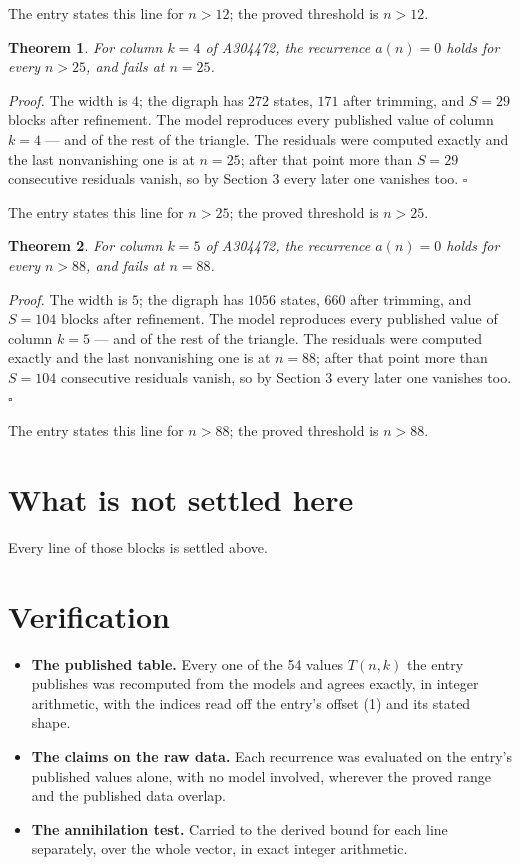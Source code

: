 \documentclass[11pt]{article}
\newtheorem{theorem}{Theorem}
\theoremstyle{definition}
\begin{document}
The entry states this line for $n > 12$; the proved threshold is $n > 12$.

\begin{theorem} For column $k = 4$ of A304472, the recurrence $a(n) = 0$ holds for every $n > 25$, and fails at $n = 25$.\end{theorem}

{\itshape Proof.} The width is $4$; the digraph has $272$ states, $171$ after trimming, and $S = 29$ blocks after refinement. The model reproduces every published value of column $k = 4$ --- and of the rest of the triangle. The residuals were computed exactly and the last nonvanishing one is at $n = 25$; after that point more than $S = 29$ consecutive residuals vanish, so by Section 3 every later one vanishes too. $\square$

The entry states this line for $n > 25$; the proved threshold is $n > 25$.

\begin{theorem} For column $k = 5$ of A304472, the recurrence $a(n) = 0$ holds for every $n > 88$, and fails at $n = 88$.\end{theorem}

{\itshape Proof.} The width is $5$; the digraph has $1056$ states, $660$ after trimming, and $S = 104$ blocks after refinement. The model reproduces every published value of column $k = 5$ --- and of the rest of the triangle. The residuals were computed exactly and the last nonvanishing one is at $n = 88$; after that point more than $S = 104$ consecutive residuals vanish, so by Section 3 every later one vanishes too. $\square$

The entry states this line for $n > 88$; the proved threshold is $n > 88$.

\section{What is not settled here}

Every line of those blocks is settled above.

\section{Verification}

\begin{itemize}

\item {\bfseries The published table.} Every one of the 54 values $T(n,k)$ the entry publishes was recomputed from the models and agrees exactly, in integer arithmetic, with the indices read off the entry's offset (1) and its stated shape.

\item {\bfseries The claims on the raw data.} Each recurrence was evaluated on the entry's published values alone, with no model involved, wherever the proved range and the published data overlap.

\item {\bfseries The annihilation test.} Carried to the derived bound for each line separately, over the whole vector, in exact integer arithmetic.

\end{itemize}
\end{document}
